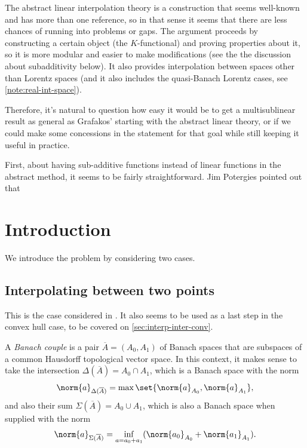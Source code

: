 \documentclass[b5paper]{article}
\newcommand\todo[1]{\textcolor{purple}{#1}}
\begin{document}
The abstract linear interpolation theory is a construction that seems well-known and has more than one reference, so in that sense it seems that there are less chances of running into problems or gaps. The argument proceeds by constructing a certain object (the \(K\)-functional) and proving properties about it, so it is more modular and easier to make modifications (see the the discussion about subadditivity below).
It also provides interpolation between spaces other than Lorentz spaces (and it also includes the quasi-Banach Lorentz cases, see \cref{note:real-int-space}).

Therefore, it's natural to question how easy it would be to get a multisublinear result as general as Grafakos' starting with the abstract linear theory, or if we could make some concessions in the statement for that goal while still keeping it useful in practice.

First, about having sub-additive functions instead of linear functions in the abstract method, it seems to be fairly straightforward. Jim Potergies pointed out that

\section{Introduction}



We introduce the problem by considering two cases.

\subsection{Interpolating between two points}

This is the case considered in \cite{jansonInterpolationMultilinearOperators1988}. It also seems to be used as a last step in the convex hull case, to be covered on \cref{sec:interp-inter-conv}.

A \emph{Banach couple} is a pair \(\overline{A} = (A_0,A_1)\) of Banach spaces that are subspaces of a common Hausdorff topological vector space. In this context, it makes sense to take the intersection \(\Delta(\overline{A}) = A_0 \cap A_1\), which is a Banach space with the norm
\[\norm{a}_{\Delta(\overline{A})} = \max \set{\norm{a}_{A_0}, \norm{a}_{A_1}},\]
and also their sum \(\Sigma(\overline{A}) = A_0 \cup A_1\), which is also a Banach space when supplied with the norm
\[\norm{a}_{\Sigma(\overline{A})} = \inf_{a = a_0 + a_1} (\norm{a_0}_{A_0}+ \norm{a_1}_{A_1}).\]
\end{document}
